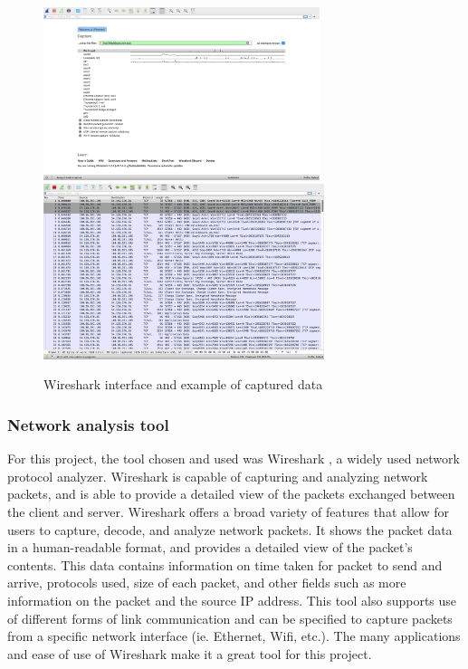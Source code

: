 \documentclass[10pt,sigconf,letterpaper,nonacm]{acmart}
\begin{document}
\begin{figure}[t]
  \centering
  \includegraphics[width=0.72\textwidth]{Figures_and_Graphs/wiresharkFigure.png}
  \includegraphics[width=0.73\textwidth]{Figures_and_Graphs/wiresharkDataFigure.png}
  \caption{Wireshark interface and example of captured data}
  \label{fig:wireshark}
\end{figure}

\subsubsection{Network analysis tool} For this project, the tool chosen and used was Wireshark \cite{Wireshark}, a widely used network protocol analyzer. Wireshark is capable of capturing and analyzing network packets, and is able to provide a detailed
 view of the packets exchanged between the client and server. Wireshark offers a broad variety of features that allow for users to capture, decode, and analyze network packets. It shows the packet data in a human-readable format, and provides a detailed view of the packet's contents.
 This data contains information on time taken for packet to send and arrive, protocols used, size of each packet, and other fields such as more information on the packet and the source IP address. This tool also supports use of different forms of link communication and can be specified to capture packets from a specific network interface (ie. Ethernet, Wifi, etc.). 
 The many applications and ease of use of Wireshark make it a great tool for this project.
 
\end{document}
